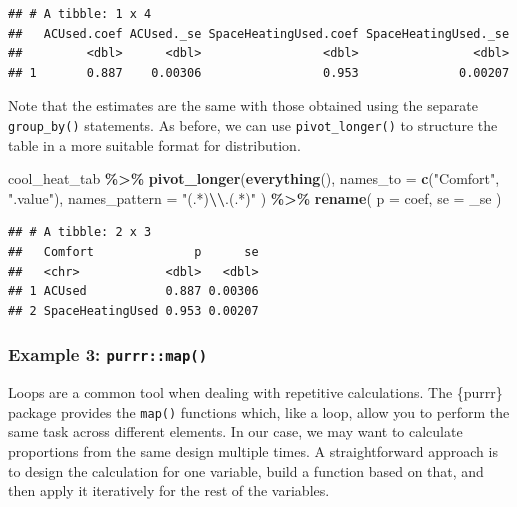 \documentclass[
]{krantz}
\makeatletter
\newenvironment{Shaded}{\begin{snugshade}}{\end{snugshade}}
\newcommand{\AttributeTok}[1]{\textcolor[rgb]{0.27,0.27,0.27}{#1}}
\newcommand{\FunctionTok}[1]{\textcolor[rgb]{0.27,0.27,0.27}{\textbf{#1}}}
\newcommand{\NormalTok}[1]{#1}
\newcommand{\SpecialCharTok}[1]{\textcolor[rgb]{0.43,0.43,0.43}{\textbf{#1}}}
\newcommand{\StringTok}[1]{\textcolor[rgb]{0.5,0.5,0.5}{#1}}
\newenvironment{kframe}{%
\medskip{}
\setlength{\fboxsep}{.8em}
 \def\at@end@of@kframe{}%
 \ifinner\ifhmode%
  \def\at@end@of@kframe{\end{minipage}}%
  \begin{minipage}{\columnwidth}%
 \fi\fi%
 \def\FrameCommand##1{\hskip\@totalleftmargin \hskip-\fboxsep
 \colorbox{shadecolor}{##1}\hskip-\fboxsep
     \hskip-\linewidth \hskip-\@totalleftmargin \hskip\columnwidth}%
 \MakeFramed {\advance\hsize-\width
   \@totalleftmargin\z@ \linewidth\hsize
   \@setminipage}}%
 {\par\unskip\endMakeFramed%
 \at@end@of@kframe}
\renewenvironment{Shaded}{\begin{kframe}}{\end{kframe}}
\makeatother
\begin{document}
\begin{verbatim}
## # A tibble: 1 x 4
##   ACUsed.coef ACUsed._se SpaceHeatingUsed.coef SpaceHeatingUsed._se
##         <dbl>      <dbl>                 <dbl>                <dbl>
## 1       0.887    0.00306                 0.953              0.00207
\end{verbatim}

Note that the estimates are the same with those obtained using the separate \texttt{group\_by()} statements. As before, we can use \texttt{pivot\_longer()} to structure the table in a more suitable format for distribution.

\begin{Shaded}
\begin{Highlighting}[]
\NormalTok{cool\_heat\_tab }\SpecialCharTok{\%\textgreater{}\%}
  \FunctionTok{pivot\_longer}\NormalTok{(}\FunctionTok{everything}\NormalTok{(),}
    \AttributeTok{names\_to =} \FunctionTok{c}\NormalTok{(}\StringTok{"Comfort"}\NormalTok{, }\StringTok{".value"}\NormalTok{),}
    \AttributeTok{names\_pattern =} \StringTok{"(.*)}\SpecialCharTok{\textbackslash{}\textbackslash{}}\StringTok{.(.*)"}
\NormalTok{  ) }\SpecialCharTok{\%\textgreater{}\%}
  \FunctionTok{rename}\NormalTok{(}
    \AttributeTok{p =}\NormalTok{ coef,}
    \AttributeTok{se =} \StringTok{\textasciigrave{}}\AttributeTok{\_se}\StringTok{\textasciigrave{}}
\NormalTok{  )}
\end{Highlighting}
\end{Shaded}

\begin{verbatim}
## # A tibble: 2 x 3
##   Comfort              p      se
##   <chr>            <dbl>   <dbl>
## 1 ACUsed           0.887 0.00306
## 2 SpaceHeatingUsed 0.953 0.00207
\end{verbatim}

\hypertarget{example-3-purrrmap}{%
\subsubsection*{\texorpdfstring{Example 3: \texttt{purrr::map()}}{Example 3: purrr::map()}}\label{example-3-purrrmap}}


Loops are a common tool when dealing with repetitive calculations. The \{purrr\} package provides the \texttt{map()} functions which, like a loop, allow you to perform the same task across different elements. In our case, we may want to calculate proportions from the same design multiple times. A straightforward approach is to design the calculation for one variable, build a function based on that, and then apply it iteratively for the rest of the variables.
\end{document}
